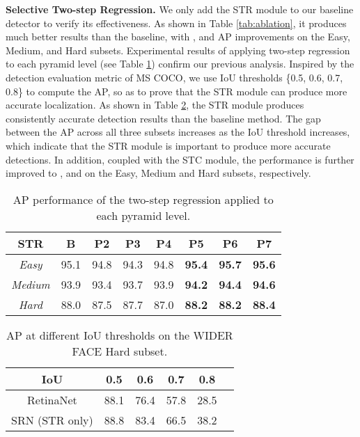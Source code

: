 \documentclass[letterpaper]{article} \usepackage{aaai19m}  \usepackage{times}  \usepackage{helvet}  \usepackage{courier}  \usepackage{url}  \usepackage{graphicx}  \usepackage{subfigure}
\begin{document}
{\flushleft \textbf{Selective Two-step Regression.} }
We only add the STR module to our baseline detector to verify its effectiveness. As shown in Table \ref{tab:ablation}, it produces much better results than the baseline, with ,  and  AP improvements on the Easy, Medium, and Hard subsets. Experimental results of applying two-step regression to each pyramid level (see Table \ref{tab:str_per_level}) confirm our previous analysis. Inspired by the detection evaluation metric of MS COCO, we use  IoU thresholds \{0.5, 0.6, 0.7, 0.8\} to compute the AP, so as to prove that the STR module can produce more accurate localization. As shown in Table \ref{tab:aps}, the STR module produces consistently accurate detection results than the baseline method. The gap between the AP across all three subsets increases as the IoU threshold increases, which indicate that the STR module is important to produce more accurate detections. In addition, coupled with the STC module, the performance is further improved to ,  and  on the Easy, Medium and Hard subsets, respectively.

\vspace{-1.5mm}
\begin{table}[h]
\centering
\setlength{\tabcolsep}{3pt}
\caption{AP performance of the two-step regression applied to each pyramid level.}
\setlength{\tabcolsep}{5.2pt}
\begin{tabular}{c|c|cccccc}
\toprule[1.5pt]
STR & B & P2 & P3 & P4 & P5 & P6 & P7 \\
\hline
{\em Easy} & 95.1 & 94.8 & 94.3 & 94.8 & \bf 95.4 & \bf 95.7 & \bf 95.6 \\
{\em Medium} & 93.9 & 93.4 & 93.7 & 93.9 & \bf 94.2 & \bf 94.4 & \bf 94.6  \\
{\em Hard} & 88.0 & 87.5 & 87.7 & 87.0 & \bf 88.2 & \bf 88.2 & \bf 88.4 \\
\bottomrule[1.5pt]
\end{tabular}
\vspace{-5mm}
\label{tab:str_per_level}
\end{table}

\begin{table}[h]
\centering
\caption{AP at different IoU thresholds on the WIDER FACE Hard subset.}
\setlength{\tabcolsep}{10.5pt}
\begin{tabular}{c|ccccc}
\toprule[1.5pt]
IoU & 0.5 & 0.6 & 0.7 & 0.8 \\
\hline
{RetinaNet} & 88.1 & 76.4 & 57.8 & 28.5\\
{SRN (STR only)} & 88.8 & 83.4 & 66.5 & 38.2\\
\bottomrule[1.5pt]
\end{tabular}
\vspace{-0.5mm}
\label{tab:aps}
\end{table}
\end{document}
